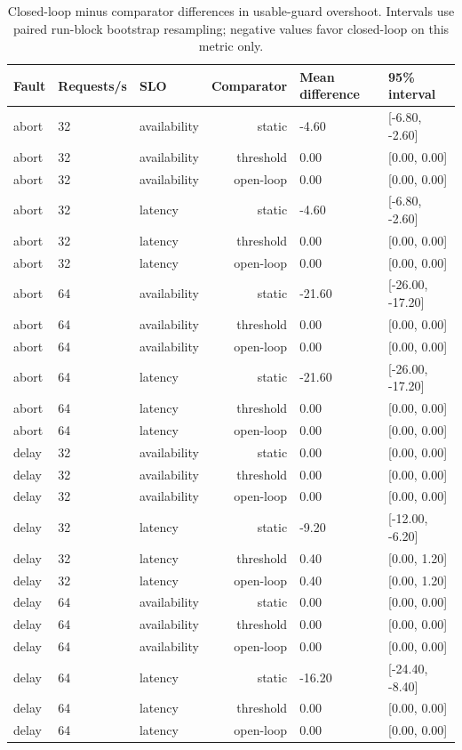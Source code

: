 \begin{table}[width=\textwidth,cols=6,pos=t]
\caption{Closed-loop minus comparator differences in usable-guard overshoot. Intervals use paired run-block bootstrap resampling; negative values favor closed-loop on this metric only.}\label{tbl:paired}
\small
\begin{tabular*}{\tblwidth}{@{\extracolsep{\fill}}lllrll@{}}
\toprule
Fault & Requests/s & SLO & Comparator & Mean difference & 95\% interval \\
\midrule
abort & 32 & availability & static & -4.60 & [-6.80, -2.60] \\
abort & 32 & availability & threshold & 0.00 & [0.00, 0.00] \\
abort & 32 & availability & open-loop & 0.00 & [0.00, 0.00] \\
abort & 32 & latency & static & -4.60 & [-6.80, -2.60] \\
abort & 32 & latency & threshold & 0.00 & [0.00, 0.00] \\
abort & 32 & latency & open-loop & 0.00 & [0.00, 0.00] \\
abort & 64 & availability & static & -21.60 & [-26.00, -17.20] \\
abort & 64 & availability & threshold & 0.00 & [0.00, 0.00] \\
abort & 64 & availability & open-loop & 0.00 & [0.00, 0.00] \\
abort & 64 & latency & static & -21.60 & [-26.00, -17.20] \\
abort & 64 & latency & threshold & 0.00 & [0.00, 0.00] \\
abort & 64 & latency & open-loop & 0.00 & [0.00, 0.00] \\
delay & 32 & availability & static & 0.00 & [0.00, 0.00] \\
delay & 32 & availability & threshold & 0.00 & [0.00, 0.00] \\
delay & 32 & availability & open-loop & 0.00 & [0.00, 0.00] \\
delay & 32 & latency & static & -9.20 & [-12.00, -6.20] \\
delay & 32 & latency & threshold & 0.40 & [0.00, 1.20] \\
delay & 32 & latency & open-loop & 0.40 & [0.00, 1.20] \\
delay & 64 & availability & static & 0.00 & [0.00, 0.00] \\
delay & 64 & availability & threshold & 0.00 & [0.00, 0.00] \\
delay & 64 & availability & open-loop & 0.00 & [0.00, 0.00] \\
delay & 64 & latency & static & -16.20 & [-24.40, -8.40] \\
delay & 64 & latency & threshold & 0.00 & [0.00, 0.00] \\
delay & 64 & latency & open-loop & 0.00 & [0.00, 0.00] \\
\bottomrule
\end{tabular*}
\end{table}

